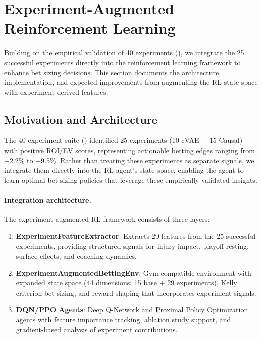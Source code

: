 \section{Experiment-Augmented Reinforcement Learning}\label{sec:experiment-augmented-rl}

Building on the empirical validation of 40 experiments (), we integrate the 25 successful experiments directly into the reinforcement learning framework to enhance bet sizing decisions. This section documents the architecture, implementation, and expected improvements from augmenting the RL state space with experiment-derived features.

\subsection{Motivation and Architecture}

The 40-experiment suite () identified 25 experiments (10 cVAE + 15 Causal) with positive ROI/EV scores, representing actionable betting edges ranging from +2.2\% to +9.5\%. Rather than treating these experiments as separate signals, we integrate them directly into the RL agent's state space, enabling the agent to learn optimal bet sizing policies that leverage these empirically validated insights.

\paragraph{Integration architecture.}
The experiment-augmented RL framework consists of three layers:
\begin{enumerate}
  \item \textbf{ExperimentFeatureExtractor}: Extracts 29 features from the 25 successful experiments, providing structured signals for injury impact, playoff resting, surface effects, and coaching dynamics.
  \item \textbf{ExperimentAugmentedBettingEnv}: Gym-compatible environment with expanded state space (44 dimensions: 15 base + 29 experiments), Kelly criterion bet sizing, and reward shaping that incorporates experiment signals.
  \item \textbf{DQN/PPO Agents}: Deep Q-Network and Proximal Policy Optimization agents with feature importance tracking, ablation study support, and gradient-based analysis of experiment contributions.
\end{enumerate}

